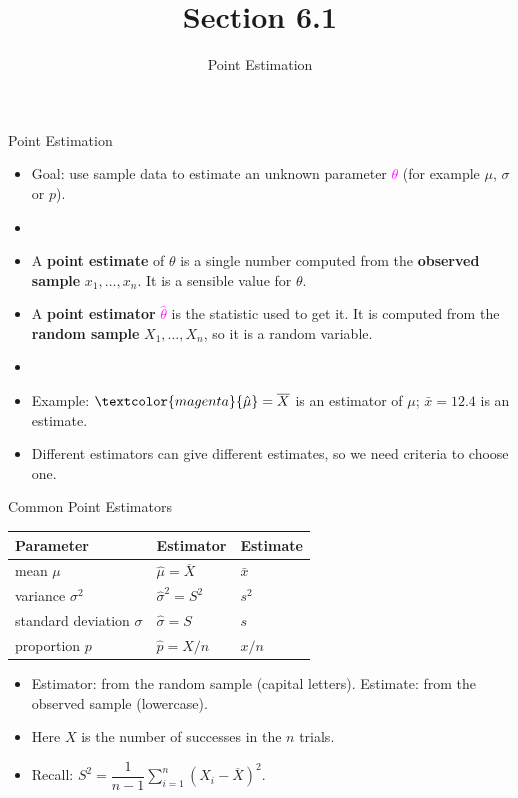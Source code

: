 \documentclass[12pt]{beamer}
\title{Section 6.1}
\subtitle{Point Estimation}
\date{}
\newcommand{\keyterm}[1]{\textcolor{examplegreen}{\textbf{#1}}}
\newcommand{\Xbar}{\overline{X}}
\newcommand{\thetahat}{\hat{\theta}}
\begin{document}
\begin{frame}
\titlepage
\end{frame}

\begin{frame}[t]{Point Estimation}
\begin{itemize}
\item Goal: use sample data to estimate an unknown parameter
  \textcolor{magenta}{$\theta$} (for example $\mu$, $\sigma$ or $p$).
\item[]
\item A \keyterm{point estimate} of $\theta$ is a single number computed from the
  \textbf{observed sample} $x_1,\dots,x_n$. It is a sensible value for $\theta$.
\item A \keyterm{point estimator} \textcolor{magenta}{$\thetahat$} is the statistic used to get it.
  It is computed from the \textbf{random sample} $X_1,\dots,X_n$, so it is a random variable.
\item[]
\item Example: $\textcolor{magenta}{\hat{\mu}}=\Xbar$ is an estimator of $\mu$;
  $\bar{x}=12.4$ is an estimate.
\item Different estimators can give different estimates, so we need criteria to choose one.
\end{itemize}
\end{frame}

\begin{frame}[t]{Common Point Estimators}
\begin{center}
\renewcommand{\arraystretch}{1.6}\setlength{\tabcolsep}{14pt}
\begin{tabular}{lll}
\toprule
Parameter & Estimator & Estimate \\
\midrule
mean $\mu$            & $\hat{\mu}=\Xbar$         & $\bar{x}$ \\
variance $\sigma^2$   & $\hat{\sigma}^2=S^2$      & $s^2$ \\
standard deviation $\sigma$ & $\hat{\sigma}=S$    & $s$ \\
proportion $p$        & $\hat{p}=X/n$             & $x/n$ \\
\bottomrule
\end{tabular}
\end{center}
\vspace{0.3cm}
\begin{itemize}
\item Estimator: from the random sample (capital letters). Estimate: from the observed sample (lowercase).
\item Here $X$ is the number of successes in the $n$ trials.
\item Recall: $S^2=\dfrac{1}{n-1}\displaystyle\sum_{i=1}^{n}(X_i-\Xbar)^2$.
\end{itemize}
\end{frame}
\end{document}
